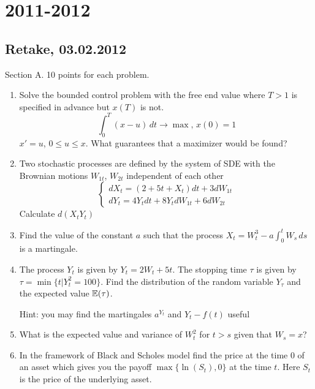 \documentclass[12pt, a4paper]{article}
\begin{document}
\section{2011-2012}

\subsection{Retake, 03.02.2012}

Section A.  10 points for each problem.

\begin{enumerate}
\item Solve the bounded control problem with the free end value where $T>1$ is specified in advance but $x(T)$ is not.
\begin{equation}
\int_0^T(x-u)\,dt\to \max,\, x(0)=1 \nonumber
\end{equation}
$x'=u$, $0\leq u\leq x$. What guarantees that a maximizer would be found?

\item Two stochastic processes are defined by the system of SDE with the Brownian motions $W_{1t}$, $W_{2t}$ independent of each other
\begin{equation}
\begin{cases}
dX_t=(2+5t+X_t)dt+3dW_{1t} \\
dY_t=4Y_t dt+8Y_t dW_{1t}+6dW_{2t} \nonumber
\end{cases}
\end{equation}
Calculate $d(X_t Y_t)$

\item Find the value of the constant $a$ such that the process $X_t=W_t^3-a\int_0^t W_s\,ds$ is a martingale.

\item The process $Y_t$ is given by $Y_t=2W_t+5t$. The stopping time $\tau$ is given by $\tau=\min\{t|Y_t^2=100\}$. Find the distribution of the random variable $Y_\tau$ and the expected value $\mathbb{E}(\tau)$.


Hint: you may find the martingales $a^{Y_t}$ and $Y_t-f(t)$ useful

\item What is the expected value and variance of $W_t^2$ for $t>s$ given that $W_s=x$?

\item In the framework of Black and Scholes model find the price at the time $0$ of an asset which gives you the payoff $\max\{\ln(S_t),0\}$ at the time $t$. Here $S_t$ is the price of the underlying asset.
\end{enumerate}
\end{document}
